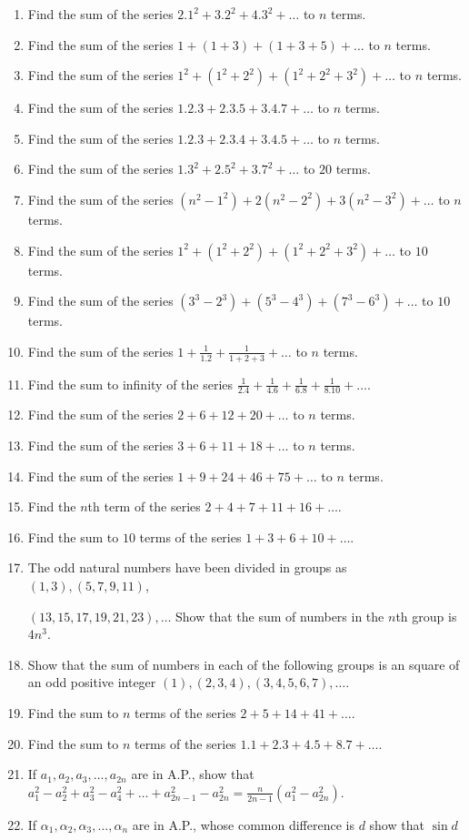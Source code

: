 \begin{enumerate}
\item Find the sum of the series $2.1^2 + 3.2^2 + 4.3^2 + \ldots$ to $n$ terms.
\item Find the sum of the series $1 + (1 + 3) + (1 + 3 + 5) + \ldots$ to $n$ terms.
\item Find the sum of the series $1^2 + (1^2 + 2^2) + (1^2 + 2^2 + 3^2) + \ldots$ to $n$ terms.
\item Find the sum of the series $1.2.3 + 2.3.5 + 3.4.7 + \ldots$ to $n$ terms.
\item Find the sum of the series $1.2.3 + 2.3.4 + 3.4.5 + \ldots$ to $n$ terms.
\item Find the sum of the series $1.3^2 + 2.5^2 + 3.7^2 + \ldots$ to $20$ terms.
\item Find the sum of the series $(n^2 - 1^2) + 2(n^2 - 2^2) + 3(n^2 - 3^2) + \ldots$ to $n$ terms.
\item Find the sum of the series $1^2 + (1^2 + 2^2) + (1^2 + 2^2 + 3^2) + \ldots$ to $10$ terms.
\item Find the sum of the series $(3^3 - 2^3) + (5^3 - 4^3) + (7^3 - 6^3) + \ldots$ to $10$ terms.
\item Find the sum of the series $1 + \frac{1}{1.2} + \frac{1}{1 + 2 + 3} + \ldots$ to $n$ terms.
\item Find the sum to infinity of the series $\frac{1}{2.4} + \frac{1}{4.6} + \frac{1}{6.8} + \frac{1}{8.10} + \ldots$.
\item Find the sum of the series $2 + 6 + 12 + 20 + \ldots$ to $n$ terms.
\item Find the sum of the series $3 + 6 + 11 + 18 + \ldots$ to $n$ terms.
\item Find the sum of the series $1 + 9 + 24 + 46 + 75 + \ldots$ to $n$ terms.
\item Find the $n$th term of the series $2 + 4 + 7 + 11 + 16 + \ldots$.
\item Find the sum to $10$ terms of the series $1 + 3 + 6 + 10 + \ldots$.
\item The odd natural numbers have been divided in groups as $(1, 3), (5, 7, 9, 11)$,

  $(13, 15, 17, 19, 21, 23), \ldots$
  Show that the sum of numbers in the $n$th group is $4n^3$.
\item Show that the sum of numbers in each of the following groups is an square of an odd positive integer $(1), (2,3,4),
  (3,4,5,6,7), \ldots$.
\item Find the sum to $n$ terms of the series $2 + 5 + 14 + 41 + \ldots$.
\item Find the sum to $n$ terms of the series $1.1 + 2.3 + 4.5 + 8.7 + \ldots$.
\item If $a_1, a_2, a_3, \ldots, a_{2n}$ are in A.P., show that $a_1^2 - a_2^2 + a_3^2 - a_4^2 + \ldots + a_{2n - 1}^2 -
  a_{2n}^2 = \frac{n}{2n - 1}(a_1^2 - a_{2n}^2)$.
\item If $\alpha_1, \alpha_2, \alpha_3, \ldots, \alpha_n$ are in A.P., whose common difference is $d$ show that $\sin
  d$


\end{enumerate}
